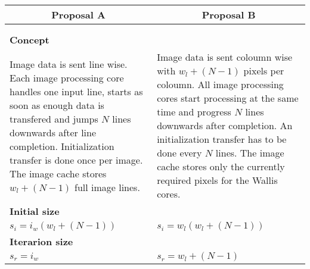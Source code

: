 \begin{table}[b!]
    \centering
    \begin{tabular}{p{} p{}}
        \toprule
        \multicolumn{1}{c}{Proposal A} & \multicolumn{1}{c}{Proposal B} \\
        \midrule
        \multicolumn{1}{c}{
            \begin{adjustbox}{scale=0.7}
                
            \end{adjustbox}}
        & 
        \multicolumn{1}{c}{
            \begin{adjustbox}{scale=0.7}
                
            \end{adjustbox}}
        \\
        \multicolumn{2}{c}{
            \begin{adjustbox}{max width=0.6\textwidth}
                
            \end{adjustbox}
        }
        \\\midrule
        \textbf{Concept} & \\
        Image data is sent line wise. Each image processing core handles one
        input line, starts as soon as enough data is transfered and jumps $N$ lines
        downwards after line completion. Initialization transfer is done once
        per image. The image cache stores $w_l+(N-1)$ full image lines.
        &
        Image data is sent coloumn wise with $w_l+(N-1)$ pixels per coloumn. All
        image processing cores start processing at the same time and progress
        $N$ lines downwards after completion. An initialization transfer has to be done
        every $N$ lines. The image cache stores only the currently required
        pixels for the Wallis cores.
        \\\midrule
        \textbf{Initial size} & \\
        {\( 
            s_i = i_w(w_l+(N-1))
        \)}
        &
        {\( 
            s_i = w_l(w_l+(N-1))
        \)}
        \\\midrule
        \textbf{Iterarion size} & \\
        {\( 
            s_r  = i_w
        \)}
        &
        {\( 
            s_r  = w_l+(N-1)
        \)}
        \\\midrule

\end{tabular}
\end{table}
